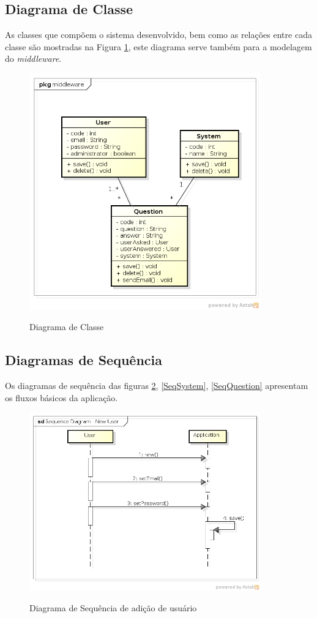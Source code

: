 \subsection{Diagrama de Classe}
	As classes que compõem o sistema desenvolvido, bem como as relações entre cada classe são mostradas
	na Figura \ref{Diagrama-Classe}, este diagrama serve também para a modelagem do \textit{middleware}.
	
	\begin{figure}[!htb]
		\caption{Diagrama de Classe}
		{\parbox{6cm}{
				\includegraphics[width=10cm]{images/ClassDiagram.png}
				\label{Diagrama-Classe}
		}}
	\end{figure}

\subsection{Diagramas de Sequência}
	Os diagramas de sequência das figuras \ref{SeqUser}, \ref{SeqSystem}, \ref{SeqQuestion} apresentam os fluxos básicos da aplicação.
	
	\begin{figure}[!htb]
		\caption{Diagrama de Sequência de adição de usuário}
		{\parbox{6cm}{
				\includegraphics[width=10cm]{images/SequenceDiagramNewUser.png}
				\label{SeqUser}
		}}
	\end{figure}


